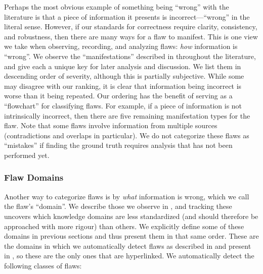 Perhaps the most obvious example of something being ``wrong'' with the
literature is that a piece of information it presents is incorrect---``wrong''
in the literal sense. However, if our standards for correctness require
clarity, consistency, and robustness, then there are many ways for a flaw to
manifest. This is one view we take when observing, recording, and analyzing
flaws: \emph{how} information is ``wrong''. We observe the
``manifestations'' described in  throughout the
literature, and give each a unique key for later analysis and discussion. We
list them in descending order of severity, although this is partially
subjective. While some may disagree with our ranking, it is clear that
information being incorrect is worse than it being repeated. Our ordering has
the benefit of serving as a ``flowchart'' for classifying flaws. For example,
if a piece of information is not intrinsically incorrect, then there are five
remaining manifestation types for the flaw. Note that some flaws involve
information from multiple sources (contradictions and overlaps in particular).
We do not categorize these flaws as ``mistakes'' if finding the ground truth
requires analysis that has not been performed yet.



\subsubsection{Flaw Domains}\label{dmn-def}

Another way to categorize flaws is by \emph{what} information is wrong, which
we call the flaw's ``domain''. We describe those we observe in
, and tracking these uncovers which knowledge domains
are less standardized (and should therefore be approached with more rigour)
than others. We explicitly define some of these domains in previous
sections and thus present them in that same order. These are the domains in
which we automatically detect flaws as described in 
and present in , so these are the only ones that are
hyperlinked. We automatically detect the following classes of flaws:

